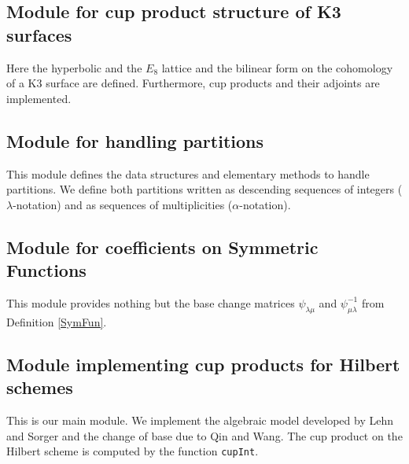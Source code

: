 \subsection{Module for cup product structure of K3 surfaces} 
Here the hyperbolic and the $E_8$ lattice and the bilinear form on the cohomology of a K3 surface are defined. Furthermore, cup products and their adjoints are implemented.

\subsection{Module for handling partitions} 
This module defines the data structures and elementary methods to handle partitions. We define both partitions written as descending sequences of integers ($\lambda$-notation) and as sequences of multiplicities ($\alpha$-notation).

\subsection{Module for coefficients on Symmetric Functions} 
This module provides nothing but the base change matrices $\psi_{\lambda\mu}$ and $\psi^{-1}_{\mu\lambda}$ from Definition \ref{SymFun}.
 
\subsection{Module implementing cup products for Hilbert schemes} This is our main module. We implement the algebraic model developed by Lehn and Sorger and the change of base due to Qin and Wang. The cup product on the Hilbert scheme is computed by the function \texttt{cupInt}.

 
